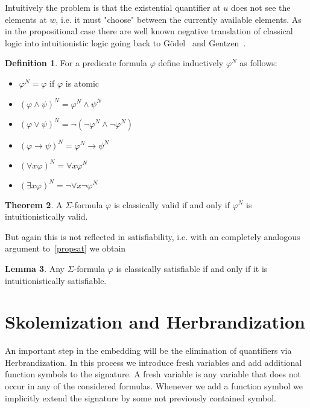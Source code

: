 \documentclass[a4paper,12pt]{report}
\theoremstyle{definition}
\newtheorem{theorem}{Theorem}[section]
\theoremstyle{definition}
\theoremstyle{definition}
\newtheorem{lemma}[theorem]{Lemma}
\theoremstyle{definition}
\theoremstyle{definition}
\newtheorem{definition}[theorem]{Definition}
\theoremstyle{definition}
\theoremstyle{definition}
\begin{document}
	Intuitively the problem is that the existential quantifier at $u$ does not see the elements at $w$, i.e. it must "choose" between the currently available elements. As in the propositional case there are well known negative translation of classical logic into intuitionistic logic going back to G\"odel~\cite{godel1933intuitionistischen} and Gentzen~\cite{gentzen1936widerspruchsfreiheit}.
	
	\begin{definition}
		For a predicate formula $\varphi$ define inductively $\varphi^N$ as follows:
		\begin{itemize}
			\item $\varphi^N = \varphi$ if $\varphi$ is atomic
			\item $(\varphi\wedge\psi)^N = \varphi^N\wedge\psi^N$
			\item $(\varphi\vee\psi)^N = \neg(\neg\varphi^N\wedge\neg\varphi^N)$
			\item $(\varphi\to\psi)^N = \varphi^N\to\psi^N$
			\item $(\forall x\varphi)^N = \forall x\varphi^N$
			\item $(\exists x\varphi)^N = \neg\forall x\neg\varphi^N$
		\end{itemize}
	\end{definition}
	\begin{theorem}
		A $\Sigma$-formula $\varphi$ is classically valid if and only if $\varphi^N$ is intuitionistically valid.
	\end{theorem}
	
	But again this is not reflected in satisfiability, i.e. with an completely analogous argument to~\ref{propsat} we obtain
	
	\begin{lemma}
		Any $\Sigma$-formula $\varphi$ is classically satisfiable if and only if it is intuitionistically satisfiable.
	\end{lemma}
	
	\section{Skolemization and Herbrandization}
	
	An important step in the embedding will be the elimination of quantifiers via Herbrandization.
	In this process we introduce fresh variables and add additional function symbols to the signature.
	A fresh variable is any variable that does not occur in any of the considered formulas.
	Whenever we add a function symbol we implicitly extend the signature by some not previously contained symbol.
	
\end{document}
